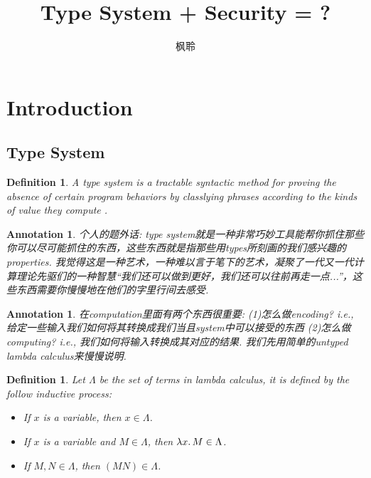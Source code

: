 \documentclass{article}
\newtheorem{definition}[theorem]{Definition}
\newtheorem{annotation}[theorem]{Annotation}
\newcommand{\lam}[2]{\ensuremath{\lambda #1\ldotp #2}} %
\begin{document}
\title{Type System + Security = ?}
\author{枫聆}
\maketitle
\tableofcontents
\newpage

\section{Introduction}

\subsection{Type System}

\begin{definition}
\rm A {\color{red} type system} is a tractable syntactic method for proving the absence of certain program behaviors by classlying phrases according to the kinds of value they compute \cite{TAPL}.
\end{definition}

\begin{annotation}
\rm 个人的题外话: type system就是一种非常巧妙工具能帮你抓住那些你可以尽可能抓住的东西，这些东西就是指那些用types所刻画的我们感兴趣的properties. 我觉得这是一种艺术，一种难以言于笔下的艺术，凝聚了一代又一代计算理论先驱们的一种智慧“我们还可以做到更好，我们还可以往前再走一点...”，这些东西需要你慢慢地在他们的字里行间去感受. 
\end{annotation}

\begin{annotation}
\rm 在computation里面有两个东西很重要: (1)怎么做encoding? i.e., 给定一些输入我们如何将其转换成我们当且system中可以接受的东西 (2)怎么做computing? i.e., 我们如何将输入转换成其对应的结果. 我们先用简单的untyped lambda calculus来慢慢说明. 
\end{annotation}

\begin{definition}
\rm Let $\Lambda$ be the set of terms in lambda calculus, it is defined by the follow inductive process:
\begin{itemize}
	\item If $x$ is a variable, then $x \in \Lambda$.
	\item If $x$ is a variable and $M \in \Lambda$, then $\lam{x}{M} \in \Lambda$.
	\item If $M, N \in \Lambda$, then $(M N) \in \Lambda$.
\end{itemize}
\end{definition}
\end{document}
